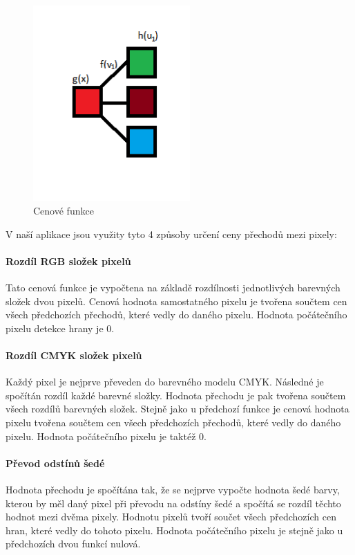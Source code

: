 \documentclass[12pt,a4paper,titlepage,final]{report}
\begin{document}
\begin{figure}[ht]
\begin{center}
\includegraphics[width=6cm]{images/cenovefce.png}
\caption{Cenové funkce}
\label{fig:theory}
\end{center}
\end{figure}

V naší aplikace jsou využity tyto 4 způsoby určení ceny přechodů mezi pixely:

\paragraph{Rozdíl RGB složek pixelů}
Tato cenová funkce je vypočtena na základě rozdílnosti jednotlivých barevných složek dvou pixelů. Cenová hodnota samostatného pixelu je tvořena součtem cen všech předchozích přechodů, které vedly do daného pixelu. Hodnota počátečního pixelu detekce hrany je 0.

\paragraph{Rozdíl CMYK složek pixelů}
Každý pixel je nejprve převeden do barevného modelu CMYK. Následné je spočítán rozdíl každé barevné složky. Hodnota přechodu je pak tvořena součtem všech rozdílů barevných složek. Stejně jako u předchozí funkce je cenová hodnota pixelu tvořena součtem cen všech předchozích přechodů, které vedly do daného pixelu. Hodnota počátečního pixelu je taktéž 0.

\paragraph{Převod odstínů šedé}
Hodnota přechodu je spočítána tak, že se nejprve vypočte hodnota šedé barvy, kterou by měl daný pixel při převodu na odstíny šedé a spočítá se rozdíl těchto hodnot mezi dvěma pixely. Hodnotu pixelů tvoří součet všech předchozích cen hran, které vedly do tohoto pixelu. Hodnota počátečního pixelu je stejně jako u předchozích dvou funkcí nulová.
\end{document}
